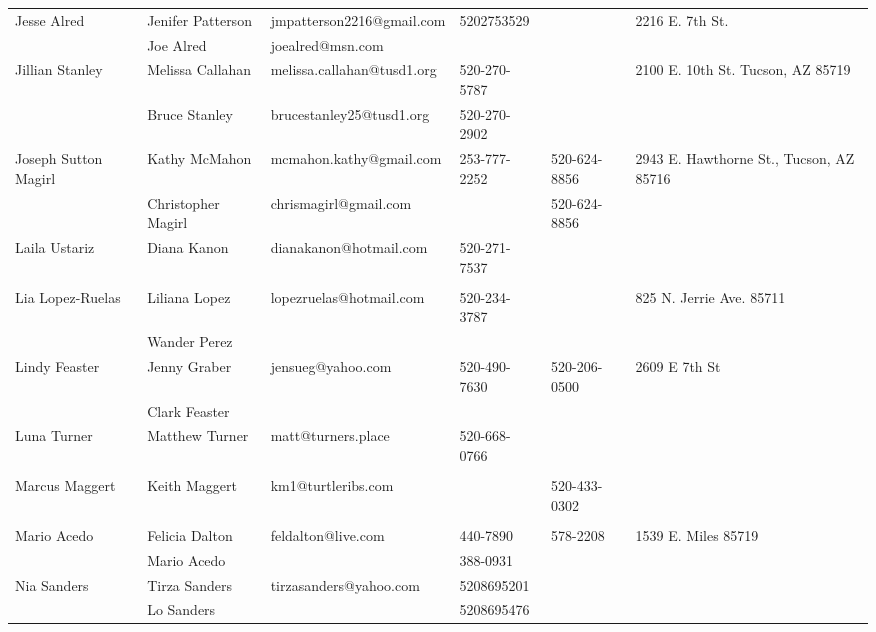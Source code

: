 \documentclass[landscape]{article}\usepackage[]{graphicx}\usepackage[]{color}
\begin{document}
\begin{longtable}{|p{100pt}|p{100pt}|p{140pt}|p{60pt}|p{64pt}|p{120pt}|}
\multirow{2}{100pt}{Jesse Alred} & Jenifer Patterson & jmpatterson2216@gmail.com & 5202753529 &  & \multirow{2}{120pt}{2216 E. 7th St.} \\
 & Joe Alred & joealred@msn.com &  &  & \\
\hline
\multirow{2}{100pt}{Jillian Stanley} & Melissa Callahan & melissa.callahan@tusd1.org & 520-270-5787 &  & \multirow{2}{120pt}{2100 E. 10th St. Tucson, AZ 85719} \\
 & Bruce Stanley & brucestanley25@tusd1.org & 520-270-2902 &  & \\
\hline
\multirow{2}{100pt}{Joseph Sutton Magirl} & Kathy McMahon & mcmahon.kathy@gmail.com & 253-777-2252 & 520-624-8856 & \multirow{2}{120pt}{2943 E. Hawthorne St., Tucson, AZ 85716} \\
 & Christopher Magirl & chrismagirl@gmail.com &  & 520-624-8856 & \\
\hline
\multirow{2}{100pt}{Laila Ustariz} & Diana Kanon & dianakanon@hotmail.com & 520-271-7537 &  & \multirow{2}{120pt}{} \\
 &  &  &  &  & \\
\hline
\multirow{2}{100pt}{Lia Lopez-Ruelas} & Liliana Lopez & lopezruelas@hotmail.com & 520-234-3787 &  & \multirow{2}{120pt}{825 N. Jerrie Ave. 85711} \\
 & Wander Perez &  &  &  & \\
\hline
\multirow{2}{100pt}{Lindy Feaster} & Jenny Graber & jensueg@yahoo.com & 520-490-7630 & 520-206-0500 & \multirow{2}{120pt}{2609 E 7th St} \\
 & Clark Feaster &  &  &  & \\
\hline
\multirow{2}{100pt}{Luna Turner} & Matthew Turner & matt@turners.place & 520-668-0766 &  & \multirow{2}{120pt}{} \\
 &  &  &  &  & \\
\hline
\multirow{2}{100pt}{Marcus Maggert} & Keith Maggert & km1@turtleribs.com &  & 520-433-0302 & \multirow{2}{120pt}{} \\
 &  &  &  &  & \\
\hline
\multirow{2}{100pt}{Mario Acedo} & Felicia Dalton & feldalton@live.com & 440-7890 & 578-2208 & \multirow{2}{120pt}{1539 E. Miles 85719} \\
 & Mario Acedo &  & 388-0931 &  & \\
\hline
\multirow{2}{100pt}{Nia Sanders} & Tirza Sanders & tirzasanders@yahoo.com & 5208695201 &  & \multirow{2}{120pt}{} \\
 & Lo Sanders &  & 5208695476 &  & \\

\end{longtable}
\end{document}
